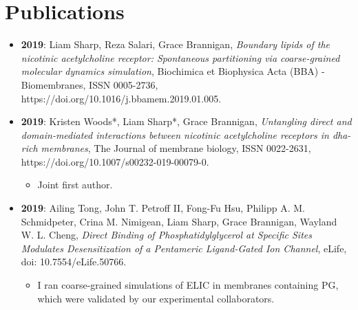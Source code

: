 \section*{Publications}
\begin{itemize}
	\item \textbf{2019}: Liam Sharp, Reza Salari, Grace Brannigan, \textit{Boundary lipids of the nicotinic acetylcholine receptor: Spontaneous partitioning via coarse-grained molecular dynamics simulation}, Biochimica et Biophysica Acta (BBA) - Biomembranes, ISSN 0005-2736, https://doi.org/10.1016/j.bbamem.2019.01.005.
	\vspace{6pt}
	\item \textbf{2019}: Kristen Woods*, Liam Sharp*, Grace Brannigan,  \textit{Untangling direct and domain-mediated interactions between nicotinic acetylcholine receptors in dha-rich membranes}, The Journal of membrane biology, ISSN 0022-2631, https://doi.org/10.1007/s00232-019-00079-0. \begin{itemize}\item Joint first author. \end{itemize}
	\vspace{6pt}
	\item \textbf{2019}: Ailing Tong, John T. Petroff II, Fong-Fu Hsu, Philipp A. M. Schmidpeter, Crina M. Nimigean, Liam Sharp,  Grace Brannigan, Wayland W. L. Cheng, \textit{Direct Binding of Phosphatidylglycerol at Specific Sites Modulates Desensitization of a Pentameric Ligand-Gated Ion Channel}, eLife, doi: 10.7554/eLife.50766.  \begin{itemize} \item I ran coarse-grained simulations of ELIC in membranes containing PG, which were validated by our experimental collaborators.  \end{itemize}
	\end{itemize}

